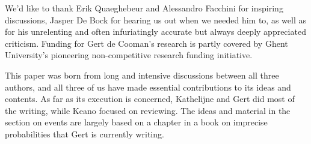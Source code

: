 \documentclass[preprint]{isipta2025}
\begin{document}
\additionalinfo%

\begin{acknowledgements}
We'd like to thank Erik Quaeghebeur and Alessandro Facchini for inspiring discussions, Jasper De Bock for hearing us out when we needed him to, as well as for his unrelenting and often infuriatingly accurate but always deeply appreciated criticism.
Funding for Gert de Cooman's research is partly covered by Ghent University's pioneering non-competitive research funding initiative.
\end{acknowledgements}

\begin{authorcontributions}
This paper was born from long and intensive discussions between all three authors, and all three of us have made essential contributions to its ideas and contents.
As far as its execution is concerned, Kathelijne and Gert did most of the writing, while Keano focused on reviewing.
The ideas and material in the section on events are largely based on a chapter in a book on imprecise probabilities that Gert is currently writing.
\end{authorcontributions}

\printbibliography
\end{document}
